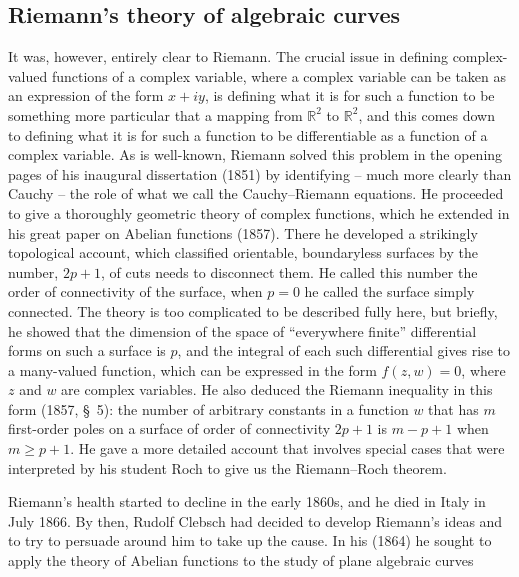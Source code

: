 \documentclass[11pt]{article}
\newcommand{\R}{\mathbb{R}}
\begin{document}
\subsection{Riemann's theory of algebraic curves}
It was, however, entirely clear to Riemann. The crucial issue in defining complex-valued functions of a complex variable, where a complex variable can be taken as an expression of the form $x+ iy$, is defining what it is for such a function to be something more particular that a mapping from $\R^2$ to $\R^2$, and this comes down to defining what it is for such a function to be differentiable as a function of a complex variable. As is well-known, Riemann solved this problem in the opening pages of his inaugural dissertation  (1851) by identifying -- much more clearly than Cauchy -- the role of what we call the Cauchy--Riemann equations. He proceeded to give a thoroughly geometric theory of complex functions, which he extended in his great paper on Abelian functions (1857). There he developed a strikingly topological account, which classified orientable, boundaryless surfaces by the number, $2p+1$, of cuts needs to disconnect them. He called this number the order of connectivity of the surface, when $p=0$ he called the surface simply connected. The theory is too complicated to be described fully here, but briefly, he showed that  the dimension of the space of ``everywhere finite'' differential forms on such a surface is $p$, and the integral of each such 
differential gives rise to a many-valued function, which can be expressed in the form $f(z, w) = 0$, where $z$ and $w$ are complex variables. He also deduced the Riemann inequality in this form (1857, \S\, 5):  the number of arbitrary constants in a function $w$ that has $m$ first-order poles on a surface of order of connectivity $2p+1$ is $m- p + 1$ when $m \geq p + 1$. He gave a more detailed account that involves special cases that were interpreted by his student Roch to give us the Riemann--Roch theorem. 

Riemann's health started to decline in the early 1860s, and he  died in Italy in July 1866. By then, Rudolf Clebsch had decided to develop Riemann's ideas and to try to persuade around him to take up the cause. In his (1864) he sought to apply the theory of Abelian functions to the study of plane algebraic curves
\end{document}
